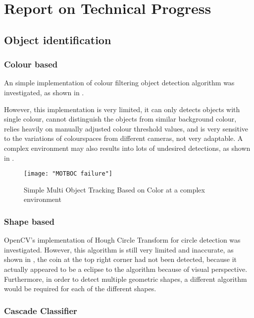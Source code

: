 \chapter{Report on Technical Progress}

\section{Object identification}

\subsection{Colour based}

An simple implementation \cite{MOTBOC.git} of colour filtering object detection algorithm was investigated, as shown in .

However, this implementation is very limited, it can only detects objects with single colour, cannot distinguish the objects from similar background colour, relies heavily on manually adjusted colour threshold values, and is very sensitive to the variations of colourspaces from different cameras, not very adaptable. A complex environment may also results into lots of undesired detections, as shown in .

\begin{figure}[H]
  \centering
  \texttt{[image: "MOTBOC failure"]}
  \caption{Simple Multi Object Tracking Based on Color \cite{MOTBOC.git} at a complex environment}
  \label{Figure:MOTBOC_F}
\end{figure}

\subsection{Shape based}

OpenCV's implementation of Hough Circle Transform for circle detection was investigated. However, this algorithm is still very limited and inaccurate, as shown in , the coin at the top right corner had not been detected, because it actually appeared to be a eclipse to the algorithm because of visual perspective. Furthermore, in order to detect multiple geometric shapes, a different algorithm would be required for each of the different shapes.

\subsection{Cascade Classifier}

